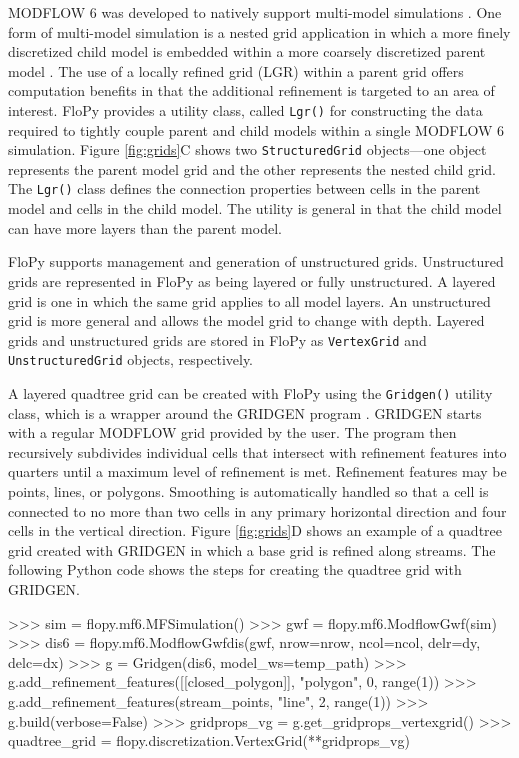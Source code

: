 \documentclass[11pt, oneside]{article}  	%
\begin{document}
MODFLOW 6 was developed to natively support multi-model simulations \citep{modflow6framework}. One form of multi-model simulation is a nested grid application in which a more finely discretized child model is embedded within a more coarsely discretized parent model \citep{modflowlgr, vilhelmsen2012evaluation, modflowlgr2}. The use of a locally refined grid (LGR) within a parent grid offers computation benefits in that the additional refinement is targeted to an area of interest. FloPy provides a utility class, called \texttt{Lgr()} for constructing the data required to tightly couple parent and child models within a single MODFLOW 6 simulation.  Figure \ref{fig:grids}C shows two \texttt{StructuredGrid} objects---one object represents the parent model grid and the other represents the nested child grid. The \texttt{Lgr()} class defines the connection properties between cells in the parent model and cells in the child model. The utility is general in that the child model can have more layers than the parent model.

FloPy supports management and generation of unstructured grids. Unstructured grids are represented in FloPy as being layered or fully unstructured. A layered grid is one in which the same grid applies to all model layers. An unstructured grid is more general and allows the model grid to change with depth. Layered grids and unstructured grids are stored in FloPy as \texttt{VertexGrid} and \texttt{UnstructuredGrid} objects, respectively.

A layered quadtree grid can be created with FloPy using the \texttt{Gridgen()} utility class, which is a wrapper around the GRIDGEN program \citep{gridgen}. GRIDGEN starts with a regular MODFLOW grid provided by the user. The program then recursively subdivides individual cells that intersect with refinement features into quarters until a maximum level of refinement is met. Refinement features may be points, lines, or polygons. Smoothing is automatically handled so that a cell is connected to no more than two cells in any primary horizontal direction and four cells in the vertical direction.  Figure \ref{fig:grids}D shows an example of a quadtree grid created with GRIDGEN in which a base grid is refined along streams. The following Python code shows the steps for creating the quadtree grid with GRIDGEN.

\begin{python}
>>> sim = flopy.mf6.MFSimulation()
>>> gwf = flopy.mf6.ModflowGwf(sim)
>>> dis6 = flopy.mf6.ModflowGwfdis(gwf, nrow=nrow, ncol=ncol, delr=dy, delc=dx)
>>> g = Gridgen(dis6, model_ws=temp_path)
>>> g.add_refinement_features([[closed_polygon]], "polygon", 0, range(1))
>>> g.add_refinement_features(stream_points, "line", 2, range(1))
>>> g.build(verbose=False)
>>> gridprops_vg = g.get_gridprops_vertexgrid()
>>> quadtree_grid = flopy.discretization.VertexGrid(**gridprops_vg)
\end{python}
\end{document}
